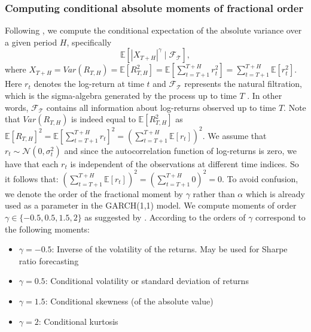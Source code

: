 \subsubsection{Computing conditional absolute moments of fractional order}\label{sssec:conditional_fractional_moments}
Following \cite{hansen2024}, we compute the conditional expectation of the absolute variance over a given period \(H\), specifically
\[\mathbb{E}[|X_{T + H}|^\gamma \mid \mathcal{F_T}],\]
 where \(X_{T+H} = Var(R_{T, H}) = \mathbb{E}[R_{T, H}^2] = \mathbb{E}[\sum_{t = T + 1}^{T + H} r_t^2] = \sum_{t = T + 1}^{T + H}\mathbb{E}[ r_t^2] \). Here \(r_t\) denotes the log-return at time \(t\) and \(\mathcal{F_T}\) represents the natural filtration, which is the sigma-algebra generated by the process up to time \(T\) \cite{lowther2009}. In other words, \(\mathcal{F_T}\) contains all information about log-returns observed up to time \(T\). Note that \(Var(R_{T, H})\) is indeed equal to \(\mathbb{E}[R_{T, H}^2]\) as \(\mathbb{E}[R_{T, H}]^2 = \mathbb{E}[\sum_{t = T + 1}^{T + H} r_t]^2 = \left(\sum_{t = T + 1}^{T + H} \mathbb{E}[r_t]\right)^2\). We assume that \(r_t \sim \mathcal{N}(0, \sigma^2_t)\) and since the autocorrelation function of log-returns is zero, we have that each \(r_t\) is independent of the observations at different time indices. So it follows that: \(\left(\sum_{t = T + 1}^{T + H} \mathbb{E}[r_t]\right)^2 = \left(\sum_{t = T + 1}^{T + H} 0\right)^2 = 0\). To avoid confusion, we denote the order of the fractional moment by \(\gamma\) rather  than \(\alpha\) which is already used as a parameter in the GARCH(1,1) model. We compute moments of order \(\gamma \in \{-0.5, 0.5, 1.5, 2\}\) as suggested by \cite{hansen2024}.
According to \cite{hansen2024} the orders of \(\gamma\) correspond to the following moments:

\begin{itemize}
\item \(\gamma = -0.5\): Inverse of the volatility of the returns. May be used for Sharpe ratio forecasting
\item \(\gamma = 0.5\): Conditional volatility or standard deviation of  returns
\item  \(\gamma = 1.5\): Conditional skewness (of the absolute value)
\item  \(\gamma = 2\): Conditional kurtosis
\end{itemize}

